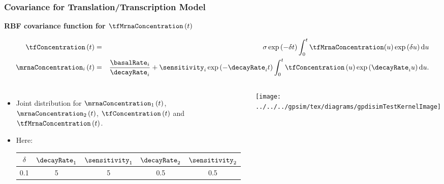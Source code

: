 \begin{frame}
  \frametitle{Covariance for Translation/Transcription Model}

  \textbf{RBF covariance function for $\tfMrnaConcentration\left(t\right)$}

  \begin{center}
    {\footnotesize \begin{eqnarray*}
        \tfConcentration\left(t\right) & = & \sigma\exp\left(-\delta t\right)\int_{0}^{t}\tfMrnaConcentration(u)\exp\left(\delta u\right)\text{d}u\\
        \mrnaConcentration_{i}\left(t\right) & = & \frac{\basalRate_{i}}{\decayRate_{i}}+\sensitivity_{i}\exp\left(-\decayRate_{i}t\right)\int_{0}^{t}\tfConcentration\left(u\right)\exp\left(\decayRate_{i}u\right)\text{d}u.\end{eqnarray*}
    }
    \par\end{center}{\footnotesize \par}

  \vspace{-2cm}

  \begin{columns}[c]


    \column{4cm}
    \begin{itemize}
    \item Joint distribution for $\mrnaConcentration_{1}\left(t\right)$, $\mrnaConcentration_{2}\left(t\right)$,
      $\tfConcentration\left(t\right)$ and $\tfMrnaConcentration\left(t\right)$.
    \item Here:\vspace{0.1cm}


      {\small }\begin{tabular}{|c|c|c|c|c|}
        \hline 
        $\delta$ & {\small $\decayRate_{1}$} & {\small $\sensitivity_{1}$} & {\small $\decayRate_{2}$} & {\small $\sensitivity_{2}$}\tabularnewline
        \hline
        \hline 
        0.1 & 5 & {\small 5} & {\small 0.5} & {\small 0.5}\tabularnewline
        \hline
      \end{tabular}{\small \par}

    \end{itemize}

    \column{6cm}

    \begin{center}
      \texttt{[image: ../../../gpsim/tex/diagrams/gpdisimTestKernelImage]}
      \par\end{center}

  \end{columns}

\end{frame}

